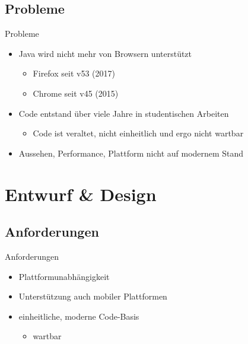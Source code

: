 \documentclass{beamer}
\begin{document}
\subsection{Probleme}
\begin{frame}{Probleme}
	\begin{itemize}
		\item Java wird nicht mehr von Browsern unterstützt
			\begin{itemize}
				\item Firefox seit v53 (2017)
				\item Chrome seit v45 (2015)
			\end{itemize}
		\item Code entstand über viele Jahre in studentischen Arbeiten
			\begin{itemize}
				\item Code ist veraltet, nicht einheitlich und ergo nicht wartbar
			\end{itemize}
		\item Aussehen, Performance, Plattform nicht auf modernem Stand
	\end{itemize}
\end{frame}

\section{Entwurf \& Design}
\subsection{Anforderungen}
\begin{frame}{Anforderungen}
	\begin{itemize}
		\item Plattformunabhängigkeit
		\item Unterstützung auch mobiler Plattformen
		\item einheitliche, moderne Code-Basis
			\begin{itemize}
				\item wartbar
			\end{itemize}
	\end{itemize}
\end{frame}
\end{document}
